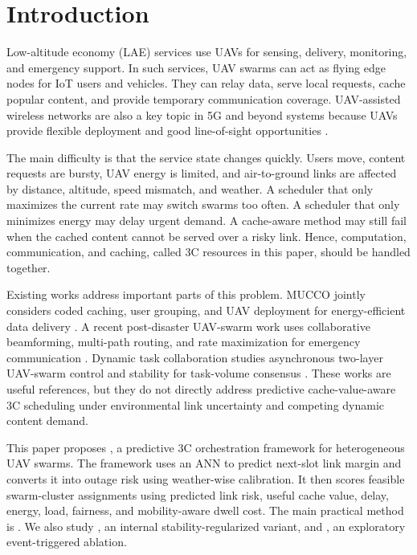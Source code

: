 \section{Introduction}
Low-altitude economy (LAE) services use UAVs for sensing, delivery, monitoring, and emergency support. In such services, UAV swarms can act as flying edge nodes for IoT users and vehicles. They can relay data, serve local requests, cache popular content, and provide temporary communication coverage. UAV-assisted wireless networks are also a key topic in 5G and beyond systems because UAVs provide flexible deployment and good line-of-sight opportunities \cite{li2019uavcommunications}.

The main difficulty is that the service state changes quickly. Users move, content requests are bursty, UAV energy is limited, and air-to-ground links are affected by distance, altitude, speed mismatch, and weather. A scheduler that only maximizes the current rate may switch swarms too often. A scheduler that only minimizes energy may delay urgent demand. A cache-aware method may still fail when the cached content cannot be served over a risky link. Hence, computation, communication, and caching, called 3C resources in this paper, should be handled together.

Existing works address important parts of this problem. MUCCO jointly considers coded caching, user grouping, and UAV deployment for energy-efficient data delivery \cite{wei2025mucco}. A recent post-disaster UAV-swarm work uses collaborative beamforming, multi-path routing, and rate maximization for emergency communication \cite{zheng2025postdisaster}. Dynamic task collaboration studies asynchronous two-layer UAV-swarm control and stability for task-volume consensus \cite{zhou2026dynamic}. These works are useful references, but they do not directly address predictive cache-value-aware 3C scheduling under environmental link uncertainty and competing dynamic content demand.

This paper proposes \pchorch, a predictive 3C orchestration framework for heterogeneous UAV swarms. The framework uses an ANN to predict next-slot link margin and converts it into outage risk using weather-wise calibration. It then scores feasible swarm-cluster assignments using predicted link risk, useful cache value, delay, energy, load, fairness, and mobility-aware dwell cost. The main practical method is \pclr. We also study \psr, an internal stability-regularized variant, and \etp, an exploratory event-triggered ablation.

